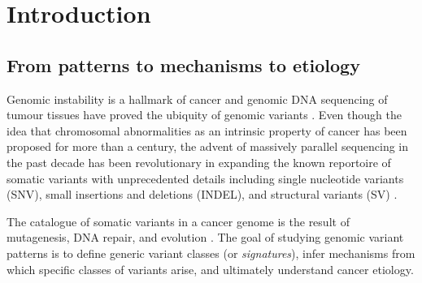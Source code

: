\documentclass[phd,tocprelim]{cornell}
\begin{document}
\contentspage
\tablelistpage
\figurelistpage


\normalspacing \setcounter{page}{1} 
\pagestyle{cornell} \addtolength{\parskip}{0.5\baselineskip}


\chapter{Introduction}


\section{From patterns to mechanisms to etiology}
Genomic instability is a hallmark of cancer \cite{Hanahan2011-ni} and genomic DNA sequencing of tumour tissues have proved the ubiquity of genomic variants \cite{pcawg_marker2020-yi}. Even though the idea that chromosomal abnormalities as an intrinsic property of cancer has been proposed \cite{Boveri2008-rl} for more than a century, the advent of massively parallel sequencing in the past decade has been revolutionary in expanding the known reportoire of somatic variants with unprecedented details including single nucleotide variants (SNV), small insertions and deletions (INDEL), and structural variants (SV) \cite{Meyerson2010-xc}.

The catalogue of somatic variants in a cancer genome is the result of mutagenesis, DNA repair, and evolution \cite{Stratton2009-ty}. The goal of studying genomic variant patterns is to define generic variant classes (or \textit{signatures}), infer mechanisms from which specific classes of variants arise, and ultimately understand cancer etiology.
\end{document}
